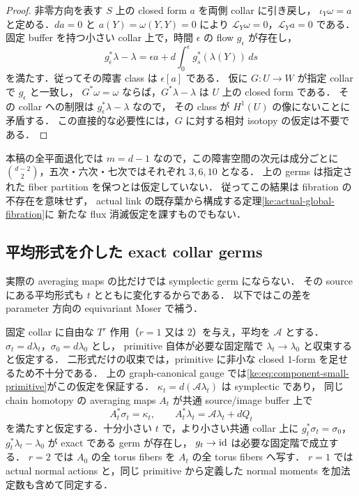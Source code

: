 \begin{proof}
非零方向を表す $S$ 上の closed form $a$ を両側 collar に引き戻し，
$\iota_Y\omega=a$ と定める．$da=0$ と $a(Y)=\omega(Y,Y)=0$ により
$\mathcal L_Y\omega=0$，$\mathcal L_Ya=0$ である．
固定 buffer を持つ小さい collar 上で，時間 $\epsilon$ の flow $g_\epsilon$ が存在し，
\[
 g_\epsilon^*\lambda-\lambda
 =\epsilon a+d\!\int_0^\epsilon g_s^*(\lambda(Y))\,ds
\]
を満たす．従ってその障害 class は $\epsilon[a]$ である．
仮に $G:U\to W$ が指定 collar で $g_\epsilon$ と一致し，
$G^*\omega=\omega$ ならば，$G^*\lambda-\lambda$ は $U$ 上の closed form である．
その collar への制限は $g_\epsilon^*\lambda-\lambda$ なので，
その class が $H^1(U)$ の像にないことに矛盾する．
この直接的な必要性には，$G$ に対する相対 isotopy の仮定は不要である．
\end{proof}

本稿の全平面退化では $m=d-1$ なので，この障害空間の次元は成分ごとに
$\binom{d-2}{2}$，五次・六次・七次ではそれぞれ $3,6,10$ となる．
上の germs は指定された fiber partition を保つとは仮定していない．
従ってこの結果は fibration の不存在を意味せず，
actual link の既存葉から構成する定理\ref{ke:actual-global-fibration}に
新たな flux 消滅仮定を課すものでもない．

\subsection{平均形式を介した exact collar germs}

実際の averaging maps の比だけでは symplectic germ にならない．
その source にある平均形式も $t$ とともに変化するからである．
以下ではこの差を parameter 方向の equivariant Moser で補う．

\begin{lemma}
\label{ke:component-exact-collar-germ}
固定 collar に自由な $T^r$ 作用（$r=1$ 又は $2$）を与え，平均を $\mathcal A$ とする．
$\sigma_t=d\lambda_t$，$\sigma_0=d\lambda_0$ とし，
primitive 自体が必要な固定階で $\lambda_t\to\lambda_0$ と収束すると仮定する．
二形式だけの収束では，primitive に非小な closed $1$-form を足せるため不十分である．
上の graph-canonical gauge では\eqref{ke:eq:component-small-primitive}がこの仮定を保証する．
$\kappa_t=d(\mathcal A\lambda_t)$ は symplectic であり，
同じ chain homotopy の averaging maps $A_t$ が共通 source/image buffer 上で
\[
 A_t^*\sigma_t=\kappa_t,\qquad
 A_t^*\lambda_t=\mathcal A\lambda_t+dQ_t
\]
を満たすと仮定する．十分小さい $t$ で，より小さい共通 collar 上に
$g_t^*\sigma_t=\sigma_0$，$g_t^*\lambda_t-\lambda_0$ が exact である germ が存在し，
$g_t\to\operatorname{id}$ は必要な固定階で成立する．
$r=2$ では $A_0$ の全 torus fibers を $A_t$ の全 torus fibers へ写す．
$r=1$ では actual normal actions と，同じ primitive から定義した
normal moments を加法定数も含めて同定する．
\end{lemma}

